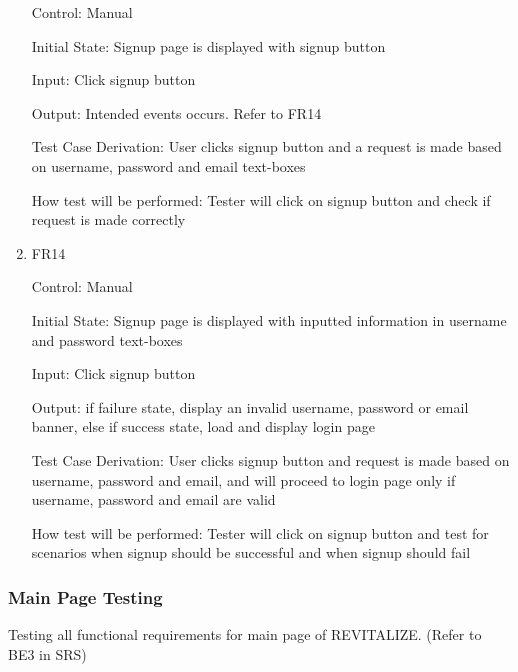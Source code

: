 \documentclass[12pt, titlepage]{article}
\begin{document}
\begin{enumerate}
Control: Manual
					
Initial State: Signup page is displayed with signup button
					
Input: Click signup button
					
Output: Intended events occurs. Refer to FR14

Test Case Derivation: User clicks signup button and a request is made based on username, password and email text-boxes

How test will be performed: Tester will click on signup button and check if request is made correctly

\item{FR14\\}

Control: Manual
					
Initial State: Signup page is displayed with inputted information in username and password text-boxes
					
Input: Click signup button
					
Output: if failure state, display an invalid username, password or email banner, else if success state, load and display login page

Test Case Derivation: User clicks signup button and request is made based on username, password and email, and will proceed to login page only if username, password and email are valid

How test will be performed: Tester will click on signup button and test for scenarios when signup should be successful and when signup should fail


\end{enumerate}

\subsubsection{Main Page Testing}

Testing all functional requirements for main page of REVITALIZE. (Refer to BE3 in SRS)
\end{document}
